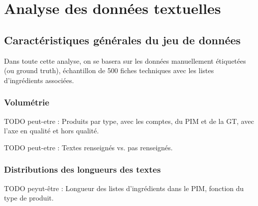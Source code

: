 \part{Analyse des données textuelles}

    \chapter{Caractéristiques générales du jeu de données}

        Dans toute cette analyse, on se basera sur les données manuellement étiquetées (ou ground truth), échantillon de 500 fiches techniques avec les listes d'ingrédients associées.

        \section{Volumétrie}

        TODO peut-etre : Produits par type, avec les comptes, du PIM et de la GT, avec l'axe en qualité et hors qualité.

        TODO peut-etre : Textes renseignés vs. pas renseignés.



        \section{Distributions des longueurs des textes}

        TODO peyut-être : Longueur des listes d'ingrédients dans le PIM, fonction du type de produit.

